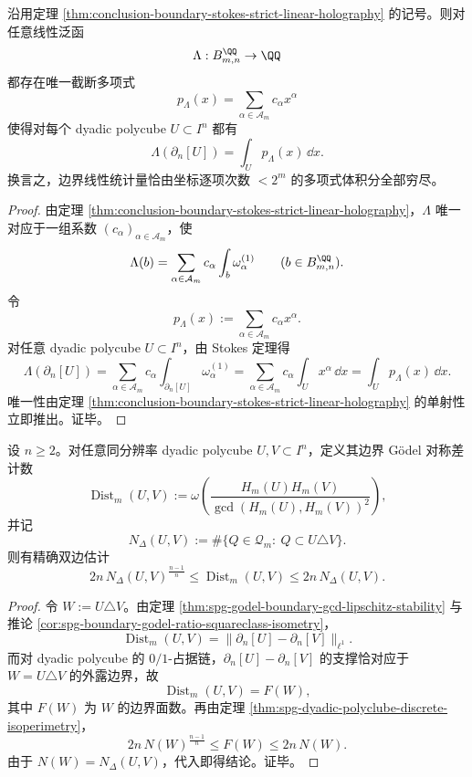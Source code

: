 \begin{corollary}[边界线性泛函的截断多项式穷尽性]\label{cor:conclusion-boundary-linear-functionals-truncated-polynomial-exhaustion}
沿用定理 \ref{thm:conclusion-boundary-stokes-strict-linear-holography} 的记号。则对任意线性泛函
\[
\Lambda:B_{m,n}^{\QQ}\to \QQ
\]
都存在唯一截断多项式
\[
p_\Lambda(x)=\sum_{\alpha\in\mathcal A_m} c_\alpha x^\alpha
\]
使得对每个 dyadic polycube \(U\subset I^n\) 都有
\[
\Lambda(\partial_n[U])=\int_U p_\Lambda(x)\,\dd x.
\]
换言之，边界线性统计量恰由坐标逐项次数 \(<2^m\) 的多项式体积分全部穷尽。
\end{corollary}

\begin{proof}
由定理 \ref{thm:conclusion-boundary-stokes-strict-linear-holography}，\(\Lambda\) 唯一对应于一组系数 \((c_\alpha)_{\alpha\in\mathcal A_m}\)，使
\[
\Lambda(b)=\sum_{\alpha\in\mathcal A_m} c_\alpha \int_b\omega^{(1)}_{\alpha}
\qquad
(b\in B_{m,n}^{\QQ}).
\]
令
\[
p_\Lambda(x):=\sum_{\alpha\in\mathcal A_m} c_\alpha x^\alpha.
\]
对任意 dyadic polycube \(U\subset I^n\)，由 Stokes 定理得
\[
\Lambda(\partial_n[U])
=
\sum_{\alpha\in\mathcal A_m} c_\alpha \int_{\partial_n[U]}\omega^{(1)}_{\alpha}
=
\sum_{\alpha\in\mathcal A_m} c_\alpha \int_U x^\alpha\,\dd x
=
\int_U p_\Lambda(x)\,\dd x.
\]
唯一性由定理 \ref{thm:conclusion-boundary-stokes-strict-linear-holography} 的单射性立即推出。证毕。
\end{proof}

\begin{theorem}\label{thm:conclusion-boundary-godel-distance-discrete-isoperimetric-law}
设 \(n\ge 2\)。对任意同分辨率 dyadic polycube \(U,V\subset I^n\)，定义其边界 Gödel 对称差计数
\[
\operatorname{Dist}_m(U,V)
:=
\omega\!\left(\frac{H_m(U)H_m(V)}{\gcd(H_m(U),H_m(V))^2}\right),
\]
并记
\[
N_\Delta(U,V):=\#\bigl\{Q\in \mathcal Q_m:\ Q\subset U\triangle V\bigr\}.
\]
则有精确双边估计
\[
2n\,N_\Delta(U,V)^{\frac{n-1}{n}}
\le
\operatorname{Dist}_m(U,V)
\le
2n\,N_\Delta(U,V).
\]
\end{theorem}

\begin{proof}
令 \(W:=U\triangle V\)。由定理 \ref{thm:spg-godel-boundary-gcd-lipschitz-stability} 与推论 \ref{cor:spg-boundary-godel-ratio-squareclass-isometry}，
\[
\operatorname{Dist}_m(U,V)
=
\bigl\|\partial_n[U]-\partial_n[V]\bigr\|_{\ell^1}.
\]
而对 dyadic polycube 的 \(0/1\)-占据链，\(\partial_n[U]-\partial_n[V]\) 的支撑恰对应于 \(W=U\triangle V\) 的外露边界，故
\[
\operatorname{Dist}_m(U,V)=F(W),
\]
其中 \(F(W)\) 为 \(W\) 的边界面数。再由定理 \ref{thm:spg-dyadic-polyclube-discrete-isoperimetry}，
\[
2n\,N(W)^{\frac{n-1}{n}}
\le
F(W)
\le
2n\,N(W).
\]
由于 \(N(W)=N_\Delta(U,V)\)，代入即得结论。证毕。
\end{proof}

